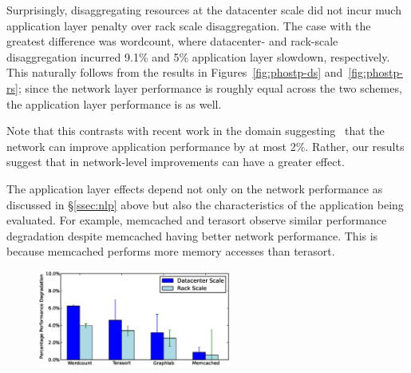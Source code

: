 Surprisingly, disaggregating resources at the datacenter scale did not incur much application layer penalty over rack scale disaggregation. The case with the greatest difference was wordcount, where datacenter- and rack-scale disaggregation incurred 9.1\% and 5\% application layer slowdown, respectively. This naturally follows from the results in Figures~\ref{fig:phostp-ds} and~\ref{fig:phostp-rs}; since the network layer performance is roughly equal across the two schemes, the application layer performance is as well. 

Note that this contrasts with recent work in the \pdis domain suggesting~\cite{kay-nsdi15} that the network can improve application performance by at most 2\%. Rather, our results suggest that in \dis network-level improvements can have a greater effect.

The application layer effects depend not only on the network performance as discussed in \S\ref{ssec:nlp} above but also the characteristics of the application being evaluated. For example, memcached and terasort observe similar performance degradation despite memcached having better network performance. This is because memcached performs more memory accesses than terasort. 

%
\begin{figure}
  \centering
    \includegraphics[width = 2.5in]{img/slowdown.eps} 
  \caption{\small{}}
  \label{fig:appfabric}
\end{figure}
%


%


